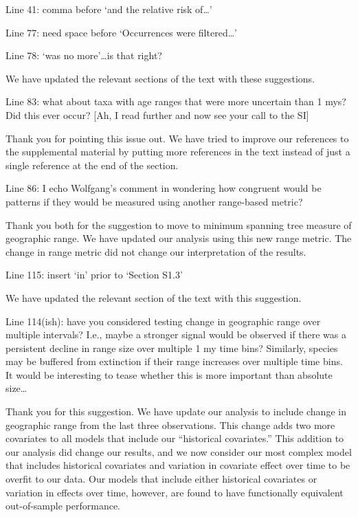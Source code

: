 \documentclass[12pt,letterpaper]{article}
\begin{document}
\begin{refsection}
\begin{bfseries}
  Line 41: comma before ‘and the relative risk of…’

  Line 77: need space before ‘Occurrences were filtered…’

  Line 78: ‘was no more’…is that right?
\end{bfseries}

We have updated the relevant sections of the text with these suggestions.

\begin{bfseries}
  Line 83: what about taxa with age ranges that were more uncertain than 1 mys? Did this ever occur? [Ah, I read further and now see your call to the SI]
\end{bfseries}

Thank you for pointing this issue out. We have tried to improve our references to the supplemental material by putting more references in the text instead of just a single reference at the end of the section.

\begin{bfseries}
  Line 86: I echo Wolfgang’s comment in wondering how congruent would be patterns if they would be measured using another range-based metric?
\end{bfseries}

Thank you both for the suggestion to move to minimum spanning tree measure of geographic range. We have updated our analysis using this new range metric. The change in range metric did not change our interpretation of the results.

\begin{bfseries}
  Line 115: insert ‘in’ prior to ‘Section S1.3’
\end{bfseries}

We have updated the relevant section of the text with this suggestion.

\begin{bfseries}
  Line 114(ish): have you considered testing change in geographic range over multiple intervals? I.e., maybe a stronger signal would be observed if there was a persistent decline in range size over multiple 1 my time bins? Similarly, species may be buffered from extinction if their range increases over multiple time bins. It would be interesting to tease whether this is more important than absolute size…
\end{bfseries}

Thank you for this suggestion. We have update our analysis to include change in geographic range from the last three observations. This change adds two more covariates to all models that include our ``historical covariates.'' This addition to our analysis did change our results, and we now consider our most complex model that includes historical covariates and variation in covariate effect over time to be overfit to our data. Our models that include either historical covariates or variation in effects over time, however, are found to have functionally equivalent out-of-sample performance.


\end{refsection}
\end{document}
